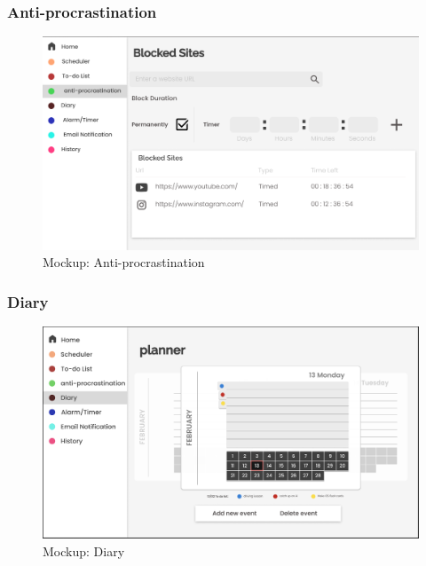 \documentclass[a4paper]{article}
\begin{document}
\subsubsection{Anti-procrastination}

\begin{figure}[H] %
	\centering %
	\includegraphics[width=1\textwidth]{./images/Mockup_Anti-procrastination.png} %
	\caption*{Mockup: Anti-procrastination} %
	\label{Fig.Anti-procrastination} %
\end{figure}

\subsubsection{Diary}

\begin{figure}[H] %
	\centering %
	\includegraphics[width=1\textwidth]{./images/Mockup_Diary.jpg} %
	\caption*{Mockup: Diary} %
	\label{Fig.Diary} %
\end{figure}
\end{document}

